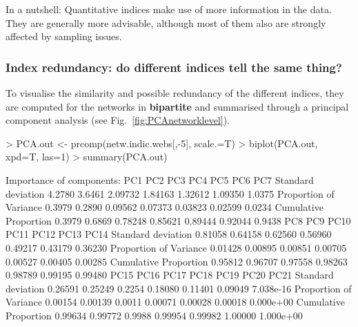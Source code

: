 \documentclass[a4paper, 11pt]{article}
\newcommand{\package}[1]{\textbf{#1}}
\begin{document}
In a nutshell: Quantitative indices make use of more information in the data. They are generally more advisable, although most of them also are strongly affected by sampling issues.



\subsubsection{Index redundancy: do different indices tell the same thing?}

To visualise the similarity and possible redundancy of the different indices, they are computed for the networks in \package{bipartite} and summarised through a principal component analysis (see Fig.~\ref{fig:PCAnetworklevel}).
\begin{Schunk}
\end{Schunk}
\begin{Schunk}
\begin{Sinput}
> PCA.out <- prcomp(netw.indic.webs[,-5], scale.=T)
> biplot(PCA.out, xpd=T, las=1)
> summary(PCA.out)
\end{Sinput}
\begin{Soutput}
Importance of components:
                          PC1    PC2     PC3     PC4     PC5     PC6    PC7
Standard deviation     4.2780 3.6461 2.09732 1.84163 1.32612 1.09350 1.0375
Proportion of Variance 0.3979 0.2890 0.09562 0.07373 0.03823 0.02599 0.0234
Cumulative Proportion  0.3979 0.6869 0.78248 0.85621 0.89444 0.92044 0.9438
                           PC8     PC9    PC10    PC11    PC12    PC13    PC14
Standard deviation     0.81058 0.64158 0.62560 0.56960 0.49217 0.43179 0.36230
Proportion of Variance 0.01428 0.00895 0.00851 0.00705 0.00527 0.00405 0.00285
Cumulative Proportion  0.95812 0.96707 0.97558 0.98263 0.98789 0.99195 0.99480
                          PC15    PC16   PC17    PC18    PC19    PC20      PC21
Standard deviation     0.26591 0.25249 0.2254 0.18080 0.11401 0.09049 7.038e-16
Proportion of Variance 0.00154 0.00139 0.0011 0.00071 0.00028 0.00018 0.000e+00
Cumulative Proportion  0.99634 0.99772 0.9988 0.99954 0.99982 1.00000 1.000e+00
\end{Soutput}
\end{Schunk}
\end{document}
